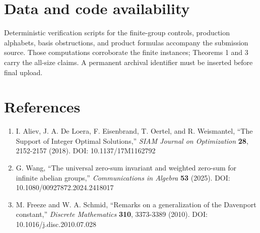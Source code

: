 \documentclass[
  11pt,
]{article}
\providecommand{\tightlist}{%
  \setlength{\itemsep}{0pt}\setlength{\parskip}{0pt}}
\begin{document}
\hypertarget{data-and-code-availability}{%
\section{Data and code availability}\label{data-and-code-availability}}

Deterministic verification scripts for the finite-group controls,
production alphabets, basis obstructions, and product formulas accompany
the submission source. Those computations corroborate the finite
instances; Theorems 1 and 3 carry the all-size claims. A permanent
archival identifier must be inserted before final upload.

\hypertarget{references}{%
\section{References}\label{references}}

\begin{enumerate}
\def\labelenumi{\arabic{enumi}.}
\tightlist
\item
  I. Aliev, J. A. De Loera, F. Eisenbrand, T. Oertel, and R. Weismantel,
  ``The Support of Integer Optimal Solutions,'' \emph{SIAM Journal on
  Optimization} \textbf{28}, 2152-2157 (2018). DOI: 10.1137/17M1162792
\item
  G. Wang, ``The universal zero-sum invariant and weighted zero-sum for
  infinite abelian groups,'' \emph{Communications in Algebra}
  \textbf{53} (2025). DOI: 10.1080/00927872.2024.2418017
\item
  M. Freeze and W. A. Schmid, ``Remarks on a generalization of the
  Davenport constant,'' \emph{Discrete Mathematics} \textbf{310},
  3373-3389 (2010). DOI: 10.1016/j.disc.2010.07.028
\end{enumerate}
\end{document}
